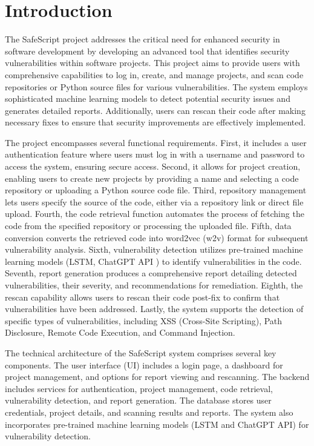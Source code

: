 \chapter{Introduction}\label{chap:introduction}

The SafeScript project addresses the critical need for enhanced security in software development by developing an advanced tool that identifies security vulnerabilities within software projects. 
This project aims to provide users with comprehensive capabilities to log in, create, and manage projects, and scan code repositories or Python source files for various vulnerabilities. 
The system employs sophisticated machine learning models to detect potential security issues and generates detailed reports. 
Additionally, users can rescan their code after making necessary fixes to ensure that security improvements are effectively implemented.

The project encompasses several functional requirements. 
First, it includes a user authentication feature where users must log in with a username and password to access the system, ensuring secure access. 
Second, it allows for project creation, enabling users to create new projects by providing a name and selecting a code repository or uploading a Python source code file. 
Third, repository management lets users specify the source of the code, either via a repository link or direct file upload. 
Fourth, the code retrieval function automates the process of fetching the code from the specified repository or processing the uploaded file. 
Fifth, data conversion converts the retrieved code into word2vec (w2v) format for subsequent vulnerability analysis. 
Sixth, vulnerability detection utilizes pre-trained machine learning models (LSTM, ChatGPT API \cite{chatgpt}) to identify vulnerabilities in the code. 
Seventh, report generation produces a comprehensive report detailing detected vulnerabilities, their severity, and recommendations for remediation. 
Eighth, the rescan capability allows users to rescan their code post-fix to confirm that vulnerabilities have been addressed. 
Lastly, the system supports the detection of specific types of vulnerabilities, including XSS (Cross-Site Scripting), Path Disclosure, Remote Code Execution, and Command Injection.

The technical architecture of the SafeScript system comprises several key components. 
The user interface (UI) includes a login page, a dashboard for project management, and options for report viewing and rescanning. 
The backend includes services for authentication, project management, code retrieval, vulnerability detection, and report generation. 
The database stores user credentials, project details, and scanning results and reports. 
The system also incorporates pre-trained machine learning models (LSTM and ChatGPT API) for vulnerability detection.

